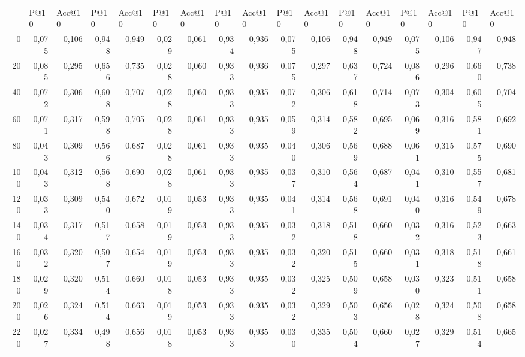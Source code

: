 \begin{table}[htb]
{\begin{tabular}{@{}rrrrrrrrrrrrrrrrr@{}}
\multicolumn{1}{l}{} & \multicolumn{1}{l}{P@10} & \multicolumn{1}{l}{Acc@10} & \multicolumn{1}{l}{P@10} & \multicolumn{1}{l}{Acc@10} & \multicolumn{1}{l}{P@10} & \multicolumn{1}{l}{Acc@10} & \multicolumn{1}{l}{P@10} & \multicolumn{1}{l}{Acc@10} & \multicolumn{1}{l}{P@10} & \multicolumn{1}{l}{Acc@10} & \multicolumn{1}{l}{P@10} & \multicolumn{1}{l}{Acc@10} & \multicolumn{1}{l}{P@10} & \multicolumn{1}{l}{Acc@10} & \multicolumn{1}{l}{P@10} & \multicolumn{1}{l}{Acc@10} \\ \cmidrule(r){1-17}
0 & 0,075 & 0,106 & 0,948 & 0,949 & 0,029 & 0,061 & 0,934 & 0,936 & 0,075 & 0,106 & 0,948 & 0,949 & 0,075 & 0,106 & 0,947 & 0,948 \\
20 & 0,085 & 0,295 & 0,656 & 0,735 & 0,028 & 0,060 & 0,933 & 0,936 & 0,075 & 0,297 & 0,637 & 0,724 & 0,086 & 0,296 & 0,660 & 0,738 \\
40 & 0,072 & 0,306 & 0,608 & 0,707 & 0,028 & 0,060 & 0,933 & 0,935 & 0,072 & 0,306 & 0,618 & 0,714 & 0,073 & 0,304 & 0,605 & 0,704 \\
60 & 0,071 & 0,317 & 0,598 & 0,705 & 0,028 & 0,061 & 0,933 & 0,935 & 0,059 & 0,314 & 0,582 & 0,695 & 0,069 & 0,316 & 0,581 & 0,692 \\
80 & 0,043 & 0,309 & 0,566 & 0,687 & 0,028 & 0,061 & 0,933 & 0,935 & 0,040 & 0,306 & 0,569 & 0,688 & 0,061 & 0,315 & 0,575 & 0,690 \\
100 & 0,043 & 0,312 & 0,568 & 0,690 & 0,028 & 0,061 & 0,933 & 0,935 & 0,037 & 0,310 & 0,564 & 0,687 & 0,041 & 0,310 & 0,557 & 0,681 \\
120 & 0,033 & 0,309 & 0,540 & 0,672 & 0,019 & 0,053 & 0,933 & 0,935 & 0,041 & 0,314 & 0,568 & 0,691 & 0,040 & 0,316 & 0,549 & 0,678 \\
140 & 0,034 & 0,317 & 0,517 & 0,658 & 0,019 & 0,053 & 0,933 & 0,935 & 0,032 & 0,318 & 0,518 & 0,660 & 0,032 & 0,316 & 0,523 & 0,663 \\
160 & 0,032 & 0,320 & 0,507 & 0,654 & 0,019 & 0,053 & 0,933 & 0,935 & 0,032 & 0,320 & 0,515 & 0,660 & 0,031 & 0,318 & 0,518 & 0,661 \\
180 & 0,029 & 0,320 & 0,514 & 0,660 & 0,018 & 0,053 & 0,933 & 0,935 & 0,032 & 0,325 & 0,509 & 0,658 & 0,030 & 0,323 & 0,511 & 0,658 \\
200 & 0,026 & 0,324 & 0,514 & 0,663 & 0,019 & 0,053 & 0,933 & 0,935 & 0,032 & 0,329 & 0,503 & 0,656 & 0,028 & 0,324 & 0,508 & 0,658 \\
220 & 0,027 & 0,334 & 0,498 & 0,656 & 0,018 & 0,053 & 0,933 & 0,935 & 0,030 & 0,335 & 0,504 & 0,660 & 0,027 & 0,329 & 0,514 & 0,665 \\

\end{tabular}}
\end{table}
